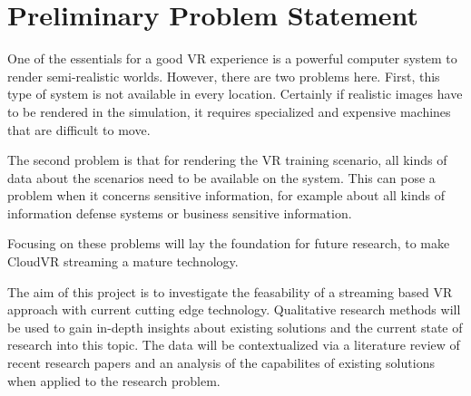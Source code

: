 \section{Preliminary Problem Statement}
One of the essentials for a good VR experience is a powerful computer system to render semi-realistic
worlds. However, there are two problems here. First, this type of system is not available in every location.
Certainly if realistic images have to be rendered in the simulation, it requires specialized and expensive machines that are difficult to move. 

The second problem is that for rendering the VR training scenario, all kinds of data about the scenarios need to be available on the system. 
This can pose a problem when it concerns sensitive information, for example about all kinds of information
defense systems or business sensitive information.

Focusing on these problems will lay the foundation for future research, to make CloudVR streaming a mature technology.

The aim of this project is to investigate the feasability of a streaming based VR approach with current cutting edge technology.
Qualitative research methods will be used to gain in-depth insights about existing solutions and the current state of research into this topic.
The data will be contextualized via a literature review of recent research papers and an analysis of the capabilites of existing solutions when applied to the research problem.